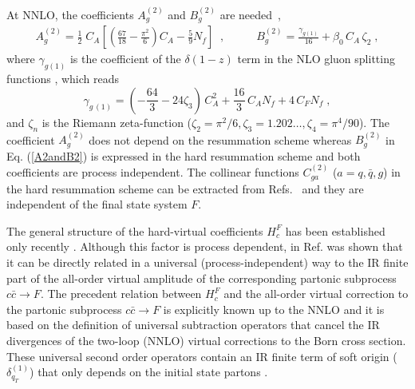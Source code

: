 \documentclass[12pt]{article}
\def\beeq{\begin{eqnarray}}
\def\eeeq{\end{eqnarray}}
\newcommand\f[2]{\frac{#1}{#2}}
\def\to{\rightarrow}
\begin{document}
At NNLO, the coefficients $A^{(2)}_{g}$ and $B^{(2)}_{g}$ are needed~\cite{Bozzi:2005wk,Catani:2013tia},
\beeq
\label{A2andB2}
A^{(2)}_{g}= \frac{1}{2}\; C_A \left[ \left( \f{67}{18} - \f{\pi^2}{6}
\right) C_A - \f{5}{9} N_f \right] \;\;,\;\;\;\;\;\;\;\;\;\;B^{(2)}_{g}=\f{\gamma_{g(1)}}{16}+\beta_0\, C_A\,\zeta_2\;,
\eeeq
where $\gamma_{g(1)}$ is the coefficient of the $\delta(1-z)$ term in the NLO gluon splitting functions \cite{Curci:1980uw,Furmanski:1980cm}, which reads
\begin{equation}
\gamma_{g\,(1)}= \left(-\frac{64}3-24\zeta_3\right)\,C_A^2
+\frac{16}3\,C_A N_f
+4\,C_F N_f\;,
\label{ga1g}
\end{equation}
and $\zeta_n$ is the Riemann zeta-function ($\zeta_2=\pi^2/6, \zeta_3=1.202\dots, \zeta_4=\pi^4/90$). The coefficient $A^{(2)}_{g}$ does not depend on the resummation scheme whereas $B^{(2)}_{g}$  in Eq. (\ref{A2andB2}) is expressed in the hard resummation scheme and both coefficients are process independent. The collinear functions $C^{(2)}_{ga}$ ($a=q,{\bar q},g$) in the hard resummation scheme can be extracted from Refs.~\cite{Catani:2013tia,Catani:2011kr} and they are independent of the final state system $F$. 

The general structure of the hard-virtual coefficients $H^{F}_{c}$ has been established only recently \cite{Catani:2013tia}. Although this  factor is process dependent, in Ref. \cite{Catani:2013tia} was shown that it can be directly related in a universal (process-independent) way to  the IR finite part of the all-order virtual amplitude of the corresponding partonic subprocess $c{\bar c}\to F$. The precedent relation between $H^{F}_{c}$ and the all-order virtual correction to the  partonic subprocess $c{\bar c}\to F$ is explicitly known up to the NNLO and it is based on the definition of universal subtraction operators that cancel the IR divergences of the two-loop (NNLO) virtual corrections to the Born cross section. These universal second order operators contain an IR finite term of soft origin ($\delta^{(1)}_{q_{T}}$)  that only depends on the initial state partons \cite{Catani:2013tia}.
\end{document}
